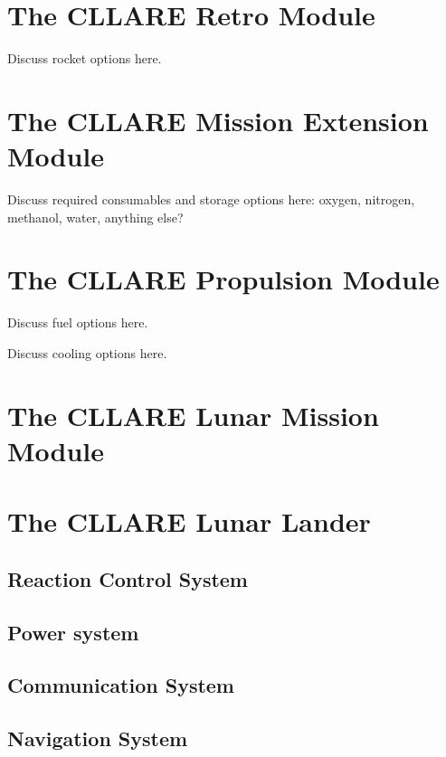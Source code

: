 \documentclass{report}
\begin{document}
\section{The CLLARE Retro Module}

Discuss rocket options here.

\section{The CLLARE Mission Extension Module}

Discuss required consumables and storage options here: oxygen, nitrogen, methanol, water, anything else?

\section{The CLLARE Propulsion Module}

Discuss fuel options here.

Discuss cooling options here.

\section{The CLLARE Lunar Mission Module}

\section{The CLLARE Lunar Lander}

\subsection{Reaction Control System}
\subsection{Power system}
\subsection{Communication System}
\subsection{Navigation System}
\end{document}
